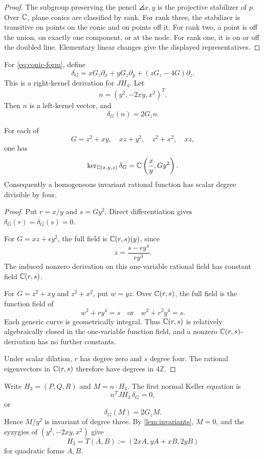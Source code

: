 \documentclass[11pt,reqno]{amsart}
\begin{document}
\begin{proof}
The subgroup preserving the pencil \(\angles{x,y}\) is the projective
stabilizer of \(p\).  Over \(\mathbb C\), plane conics are classified by rank.
For rank three, the stabilizer is transitive on points on the conic and on
points off it.  For rank two, a point is off the union, on exactly one
component, or at the node.  For rank one, it is on or off the doubled line.
Elementary linear changes give the displayed representatives.
\end{proof}

For \eqref{eq:conic-form}, define
\[
\delta_G=xG_z\partial_x+yG_z\partial_y+(zG_z-4G)\partial_z.
\]
This is a right-kernel derivation for \(JH_4\).  Let
\[
n=(y^2,-2xy,x^2)^T.
\]
Then \(n\) is a left-kernel vector, and
\[
\delta_G(n)=2G_z n.
\]

\begin{lemma}
\label{lem:invariants}
For each of
\[
G=z^2+xy,\quad xz+y^2,\quad z^2+x^2,\quad xz,
\]
one has
\[
\ker_{\mathbb C(x,y,z)}\delta_G
=\mathbb C\left(\frac{x}{y},Gy^2\right).
\]
Consequently a homogeneous invariant rational function has scalar degree
divisible by four.
\end{lemma}

\begin{proof}
Put \(r=x/y\) and \(s=Gy^2\).  Direct differentiation gives
\(\delta_G(r)=\delta_G(s)=0\).

For \(G=xz+\epsilon y^2\), the full field is
\(\mathbb C(r,s)(y)\), since
\[
z=\frac{s-\epsilon y^4}{ry^3}.
\]
The induced nonzero derivation on this one-variable rational field has
constant field \(\mathbb C(r,s)\).

For \(G=z^2+xy\) and \(z^2+x^2\), put \(w=yz\).  Over
\(\mathbb C(r,s)\), the full field is the function field of
\[
w^2+r y^4=s
\quad\text{or}\quad
w^2+r^2y^4=s.
\]
Each generic curve is geometrically integral.  Thus \(\mathbb C(r,s)\) is
relatively algebraically closed in the one-variable function field, and a
nonzero \(\mathbb C(r,s)\)-derivation has no further constants.

Under scalar dilation, \(r\) has degree zero and \(s\) degree four.  The
rational eigenvectors in \(\mathbb C(r,s)\) therefore have degrees in
\(4\mathbb Z\).
\end{proof}

Write \(H_3=(P,Q,R)\) and \(M=n\cdot H_3\).  The first normal Keller
equation is
\[
n^TJH_3\,\delta_G=0,
\]
or
\[
\delta_G(M)=2G_zM.
\]
Hence \(M/y^2\) is invariant of degree three.  By
\cref{lem:invariants}, \(M=0\), and the syzygies of
\((y^2,-2xy,x^2)\) give
\begin{equation}
\label{eq:TAB}
H_3=T(A,B):=(2xA,yA+xB,2yB)
\end{equation}
for quadratic forms \(A,B\).
\end{document}
